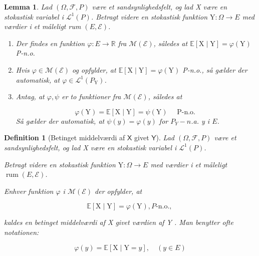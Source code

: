 \documentclass{article}
\newcommand{\1}{\mathbbm{1}}
\newcommand{\X}{\mathsf{X}}
\newcommand{\Y}{\mathsf{Y}}
\theoremstyle{boxed}
\newtheorem{definition}[theorem]{Definition}
\newtheorem{lemma}[theorem]{Lemma}
\begin{document}
\begin{theorem-box}
    \begin{lemma}
        Lad $(\Omega, \mathcal{F}, P)$ være et sandsynlighedsfelt, og lad X være en stokastisk variabel i $\mathcal{L}^1(P)$. Betragt videre en stokastisk funktion $\mathrm{Y}: \Omega \rightarrow E$ med værdier i et måleligt rum $(E, \mathcal{E})$.
\begin{enumerate}
    \item[\textnormal{(i)}] Der findes en funktion $\varphi: E \rightarrow \mathbb{R}$ fra $\mathcal{M}(\mathcal{E})$, således at $\mathbb{E}[\mathrm{X} \mid \mathrm{Y}]=\varphi(\mathrm{Y})$ P-n.o.

    \item[\textnormal{(ii)}] Hvis $\varphi \in \mathcal{M}(\mathcal{E})$ og opfylder, at $\mathbb{E}[\mathrm{X} \mid \mathrm{Y}]=\varphi(\mathrm{Y})$ P-n.o., så gælder der automatisk, at $\varphi \in \mathcal{L}^1\left(P_{\mathrm{Y}}\right)$.
    \item[\textnormal{(iii)}]  Antag, at $\varphi, \psi$ er to funktioner fra $\mathcal{M}(\mathcal{E})$, således at

    $$
    \varphi(\mathrm{Y})=\mathbb{E}[\mathrm{X} \mid \mathrm{Y}]=\psi(\mathrm{Y}) \quad \text { P-n.o. }
    $$
    Så gælder der automatisk, at $\psi(y)=\varphi(y)$ for $P_Y-n$.a. y i $E$.
\end{enumerate}
    \end{lemma}
\end{theorem-box}
\begin{theorem-box}
    \begin{definition}[Betinget middelværdi af $\X$ givet $\Y$]
        Lad $(\Omega, \mathcal{F}, P)$ være et sandsynlighedsfelt, og lad X være en stokastisk variabel i $\mathcal{L}^1(P)$.

Betragt videre en stokastisk funktion $\mathrm{Y}: \Omega \rightarrow E$ med værdier i et måleligt $\operatorname{rum}(E, \mathcal{E})$.

Enhver funktion $\varphi$ i $\mathcal{M}(\mathcal{E})$ der opfylder, at

$$
\mathbb{E}[\mathrm{X} \mid \mathrm{Y}]=\varphi(\mathrm{Y}), P \text {-n.o., }
$$

kaldes en betinget middelværdi af X givet værdien af Y .
Man benytter ofte notationen:

$$
\varphi(y)=\mathbb{E}[\mathrm{X} \mid \mathrm{Y}=y], \quad(y \in E)
$$

    \end{definition}
\end{theorem-box}
\end{document}

